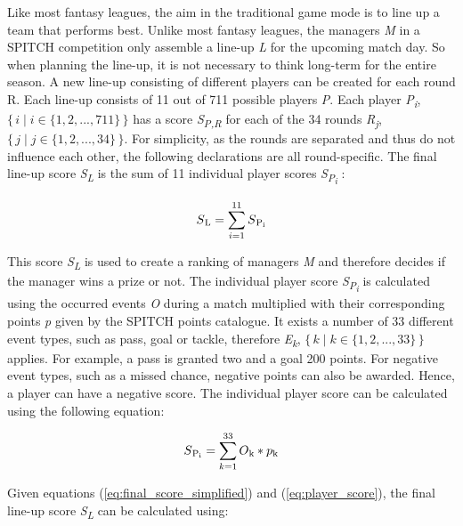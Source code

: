 Like most fantasy leagues, the aim in the traditional game mode is to line up a team that performs best. Unlike most fantasy leagues, the managers \emph{M} in a SPITCH competition only assemble a line-up \emph{L} for the upcoming match day. So when planning the line-up, it is not necessary to think long-term for the entire season. A new line-up consisting of different players can be created for each round R. Each line-up consists of 11 out of 711 possible players \emph{P}. Each player \emph{P\textsubscript{i}}, $\{\,i \mid i \in \{1, 2, ..., 711\}\,\}$ has a score \emph{S\textsubscript{P,R}} for each of the 34 rounds \emph{R\textsubscript{j}}, $\{\, j \mid j \in \{1, 2, ..., 34\}\,\}$. For simplicity, as the rounds are separated and thus do not influence each other, the following declarations are all round-specific. The final line-up score \emph{S\textsubscript{L}} is the sum of 11 individual player scores \emph{S\textsubscript{P\textsubscript{i}}} :

\begin{equation}
    S\textsubscript{L} = \sum_{i=1}^{11} S\textsubscript{P\textsubscript{i}}
    \label{eq:final_score_simplified}
\end{equation}

This score \emph{S\textsubscript{L}} is used to create a ranking of managers \emph{M} and therefore decides if the manager wins a prize or not. The individual player score \emph{S\textsubscript{P\textsubscript{i}}} is calculated using the occurred events \emph{O} during a match multiplied with their corresponding points \emph{p} given by the SPITCH points catalogue. It exists a number of 33 different event types, such as pass, goal or tackle, therefore \emph{E\textsubscript{k}}, $\{\, k \mid k \in \{1, 2, ..., 33\}\,\}$ applies. For example, a pass is granted two and a goal 200 points. For negative event types, such as a missed chance, negative points can also be awarded. \parencite[cf.][]{spitch_points_nodate} Hence, a player can have a negative score. The individual player score can be calculated using the following equation:

\begin{equation}
    S\textsubscript{P\textsubscript{i}} = \sum_{k=1}^{33} O\textsubscript{k} * p\textsubscript{k}
    \label{eq:player_score}
\end{equation}

Given equations (\ref{eq:final_score_simplified}) and (\ref{eq:player_score}), the final line-up score \emph{S\textsubscript{L}} can be calculated using:

